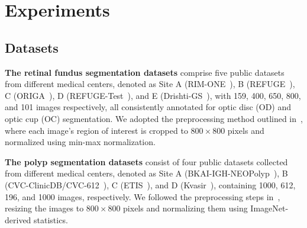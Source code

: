 %   

\section{Experiments}

\subsection{Datasets}

\textbf{The retinal fundus segmentation datasets} comprise five public datasets from different medical centers, denoted as Site A (RIM-ONE~\cite{fumero2011rim}), B (REFUGE~\cite{orlando2020refuge}), C (ORIGA~\cite{zhang2010origa}), D (REFUGE-Test~\cite{orlando2020refuge}), and E (Drishti-GS~\cite{sivaswamy2014drishti}), with 159, 400, 650, 800, and 101 images respectively, all consistently annotated for optic disc (OD) and optic cup (OC) segmentation. We adopted the preprocessing method outlined in~\cite{liu2022single,chen2024each}, where each image's region of interest is cropped to $800\times800$ pixels and normalized using min-max normalization.

\noindent \textbf{The polyp segmentation datasets} consist of four public datasets collected from different medical centers, denoted as Site A (BKAI-IGH-NEOPolyp~\cite{ngoc2021neounet}), B (CVC-ClinicDB/CVC-612~\cite{bernal2015wm}), C (ETIS~\cite{silva2014toward}), and D (Kvasir~\cite{jha2020kvasir}), containing 1000, 612, 196, and 1000 images, respectively. We followed the preprocessing steps in~\cite{chen2024each}, resizing the images to $800 \times 800$ pixels and normalizing them using ImageNet-derived statistics.

